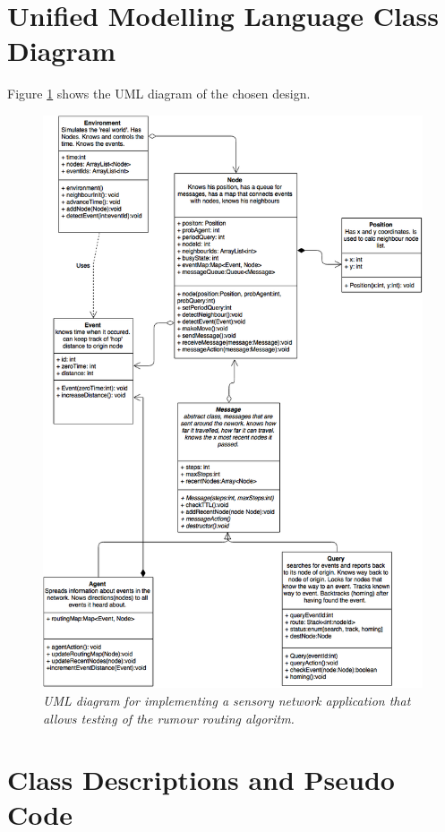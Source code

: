 \documentclass[a4paper,11pt,twoside]{article}
\begin{document}
\section{Unified Modelling Language Class Diagram}
Figure \ref{fig:uml} shows the UML diagram of the chosen design. 
\begin{figure}
\centering
\includegraphics[width=\textwidth]{uml.png}
\caption{\textit{UML diagram for implementing a sensory network application
  that allows testing of the rumour routing algoritm.}}
\label{fig:uml}
\end{figure}

\section{Class Descriptions and Pseudo Code}
\end{document}
